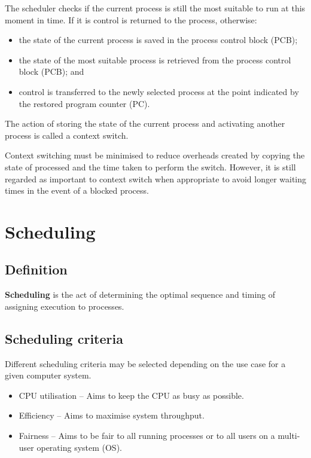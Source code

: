 \documentclass[a4paper]{systems-software}
\begin{document}
The scheduler checks if the current process is still the most suitable to run at this moment in time. If it is control is returned to the process, otherwise:
\begin{itemize}
	\item the state of the current process is saved in the process control block (PCB);
	\item the state of the most suitable process is retrieved from the process control block (PCB); and
	\item control is transferred to the newly selected process at the point indicated by the restored program counter (PC).
\end{itemize}

The action of storing the state of the current process and activating another process is called a context switch.

Context switching must be minimised to reduce overheads created by copying the state of processed and the time taken to perform the switch. However, it is still regarded as important to context switch when appropriate to avoid longer waiting times in the event of a blocked process.


\section*{Scheduling}

\subsection*{Definition}

\textbf{Scheduling} is the act of determining the optimal sequence and timing of assigning execution to processes.


\subsection*{Scheduling criteria}

Different scheduling criteria may be selected depending on the use case for a given computer system.

\begin{itemize}
	\item CPU utilisation -- Aims to keep the CPU as busy as possible.
	\item Efficiency -- Aims to maximise system throughput.
	\item Fairness -- Aims to be fair to all running processes or to all users on a multi-user operating system (OS).
\end{itemize}
\end{document}
